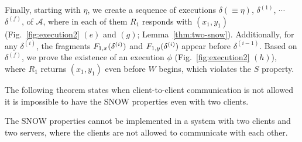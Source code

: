 {   %
    Finally, starting with  $\eta$, we create a sequence of executions $\delta (\equiv \eta)$, $\delta^{(1)}$, $\cdots$ $\delta^{(f)}$, of $\mathcal{A}$, 
     where in each of them $R_1$ responds with $(x_1, y_1)$  (Fig.~\ref{fig:execution2} $(e)$ and $(g)$; Lemma~\ref{thm:two-snow}). Additionally,  for any $\delta^{(i)}$, the fragments   ${ F_{1,x}(\delta^{(i)})}$ and
    ${ F_{1,y}(\delta^{(i)})}$  appear before $\delta^{(i-1)}$.
    Based on $\delta^{(f)}$, we prove the existence of an execution $\phi$ (Fig.~\ref{fig:execution2} $(h)$), where $R_1$ returns 
    $(x_1, y_1)$ even before $W$ begins, which violates the $S$ property.
}



  The following theorem states when client-to-client communication is not allowed it is impossible to have the SNOW properties even with  two clients. 

 \begin{theorem}\label{thm:two-snow}
 The SNOW properties cannot be implemented in a system with two clients and two servers, where the clients are not allowed to communicate with each other.
\end{theorem}




